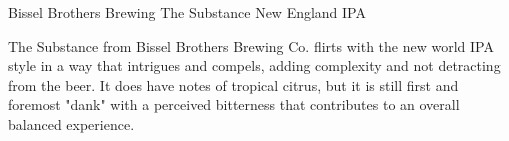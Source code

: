 \begin{recipie}{Bissel Brothers Brewing The Substance New England IPA}

\begin{aboutblock}
The Substance from Bissel Brothers Brewing Co. flirts with the new world IPA style in a way
that intrigues and compels, adding complexity and not detracting from the beer. It does have
notes of tropical citrus, but it is still first and foremost "dank" with a perceived bitterness
that contributes to an overall balanced experience.
\end{aboutblock}


\begin{methodandtiming}
 
\begin{mashsteps}
\end{mashsteps}

\begin{fermentationsteps}
\end{fermentationsteps}

\end{methodandtiming}

\pagebreak

\begin{ingredientsblock}

\begin{malts}
\end{malts}

\begin{hops}

\end{hops}

\begin{yeasts}
\end{yeasts}

\end{ingredientsblock}

\end{recipie}

